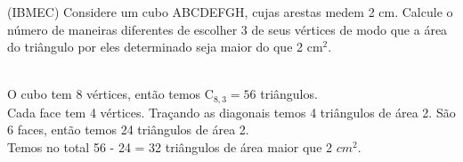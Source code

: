 \begin{ex}
(IBMEC) Considere um cubo ABCDEFGH, cujas arestas medem 2 cm. Calcule o número de maneiras diferentes de escolher 3 de seus vértices de modo que a área do triângulo por eles determinado seja maior do que 2 $\text{cm}^2$.
  \begin{sol}
    \phantom{A} \\
  O cubo tem 8 vértices, então temos $\mathrm{C}_{8,3}= 56$ triângulos.\\ 
  Cada face tem 4 vértices. Traçando as diagonais temos 4 triângulos de área 2. São 6 faces, então temos 24 triângulos de área 2.\\
  Temos no total 56 - 24 = 32 triângulos de área maior que 2 $cm^2$.  
  \end{sol}
\end{ex}